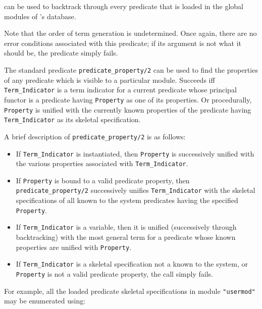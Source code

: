 \begin{description}

    can be used to backtrack through every predicate that is loaded in the
    global modules of \ourprolog's database.

    Note that the order of term generation is undetermined. Once again, 
    there are no error conditions associated with this predicate; if its
    argument is not what it should be, the predicate simply fails.

\label{PredProp}
    The standard predicate {\tt predicate\_property/2} can be used to find 
    the properties of any predicate which is visible to a particular module.
    Succeeds iff {\tt Term\_Indicator} is a term indicator for a current 
    predicate whose principal functor is a predicate having {\tt Property} 
    as one of its properties. Or procedurally, {\tt Property} is unified 
    with the currently known properties of the predicate having 
    {\tt Term\_Indicator} as its skeletal specification.
    
    A brief description of {\tt predicate\_property/2} is as follows:
    \begin{itemize}
    \item If {\tt Term\_Indicator} is instantiated, then {\tt Property}
          is successively unified with the various properties associated 
          with {\tt Term\_Indicator}.
    \item If {\tt Property} is bound to a valid predicate property, then
          {\tt predicate\_property/2} successively unifies 
          {\tt Term\_Indicator} with the skeletal specifications of all 
          known to the system predicates having the specified {\tt Property}.
    \item If {\tt Term\_Indicator} is a variable, then it is unified
          (successively through backtracking) with the most general term for a
          predicate whose known properties are unified with {\tt Property}.
    \item If {\tt Term\_Indicator} is a skeletal specification not a known to 
          the system, or {\tt Property} is not a valid predicate 
	  property, the call simply fails.
    \end{itemize} 
    For example, all the loaded predicate skeletal specifications in module 
    {\tt "usermod"} may be enumerated using:



\end{description}

